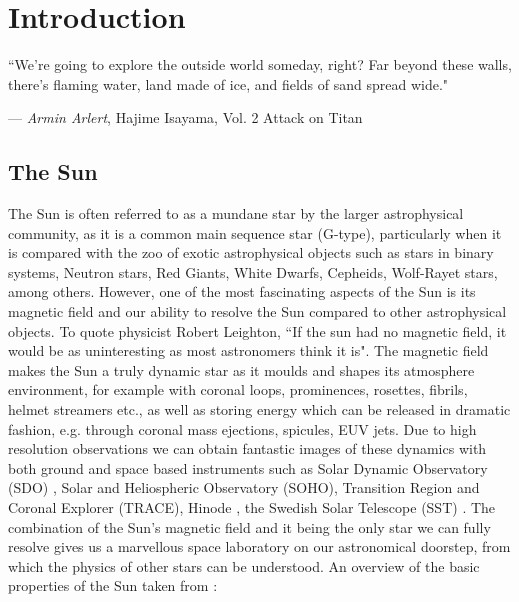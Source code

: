 \documentclass[12pt]{ociamthesis}
\begin{document}
\chapter{Introduction}
\label{chap:intro}
\epigraph{``We're going to explore the outside world someday, right? Far beyond these walls, there's flaming water, land made of ice, and fields of sand spread wide."}{--- \textit{Armin Arlert}, \textup{Hajime Isayama}, Vol. 2  Attack on Titan}
\section{The Sun}
\label{sec:Sun}
The Sun is often referred to as a mundane star by the larger astrophysical community, as it is a common main sequence star (G-type), particularly when it is compared with the zoo of exotic astrophysical objects such as stars in binary systems, Neutron stars, Red Giants, White Dwarfs, Cepheids, Wolf-Rayet stars, among others. However, one of the most fascinating aspects of the Sun is its magnetic field and our ability to resolve the Sun compared to other astrophysical objects. To quote physicist Robert Leighton, ``If the sun had no magnetic field, it would be as uninteresting as most astronomers think it is". The magnetic field makes the Sun a truly dynamic star as it moulds and shapes its atmosphere environment, for example with coronal loops, prominences, rosettes, fibrils, helmet streamers etc., as well as storing energy which can be released in dramatic fashion, e.g. through coronal mass ejections, spicules, EUV jets. Due to high resolution observations we can obtain fantastic images of these dynamics with both ground and space based instruments such as Solar Dynamic Observatory (SDO) \citep{Lemen2012SoPh27517L}, Solar and Heliospheric Observatory (SOHO), Transition Region and Coronal Explorer (TRACE), Hinode \citep{Tsuneta2008SoPh,Suematsu2008SoPh,Ichimoto2008SoPh}, the Swedish Solar Telescope (SST) \citep{Scharmer2003SPIE}. The combination of the Sun's magnetic field and it being the only star we can fully resolve gives us a marvellous space laboratory on our astronomical doorstep, from which the physics of other stars can be understood. An overview of the basic properties of the Sun taken from \cite{priest2014magnetohydrodynamics}:
\end{document}
